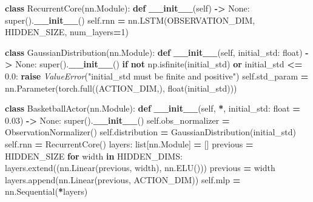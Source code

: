 \documentclass[
  chinese,
  11pt,
  letterpaper,
]{article}
\newenvironment{Shaded}{\begin{snugshade}}{\end{snugshade}}
\newcommand{\BuiltInTok}[1]{#1}
\newcommand{\ControlFlowTok}[1]{\textcolor[rgb]{0.13,0.29,0.53}{\textbf{#1}}}
\newcommand{\DecValTok}[1]{\textcolor[rgb]{0.00,0.00,0.81}{#1}}
\newcommand{\FloatTok}[1]{\textcolor[rgb]{0.00,0.00,0.81}{#1}}
\newcommand{\FunctionTok}[1]{\textcolor[rgb]{0.13,0.29,0.53}{\textbf{#1}}}
\newcommand{\KeywordTok}[1]{\textcolor[rgb]{0.13,0.29,0.53}{\textbf{#1}}}
\newcommand{\NormalTok}[1]{#1}
\newcommand{\OperatorTok}[1]{\textcolor[rgb]{0.81,0.36,0.00}{\textbf{#1}}}
\newcommand{\PreprocessorTok}[1]{\textcolor[rgb]{0.56,0.35,0.01}{\textit{#1}}}
\newcommand{\StringTok}[1]{\textcolor[rgb]{0.31,0.60,0.02}{#1}}
\newcommand{\VariableTok}[1]{\textcolor[rgb]{0.00,0.00,0.00}{#1}}
\renewenvironment{Shaded}{\par\smallskip}{\par\smallskip}
\begin{document}
\begin{Shaded}
\begin{Highlighting}[]
\KeywordTok{class}\NormalTok{ RecurrentCore(nn.Module):}
    \KeywordTok{def} \FunctionTok{\_\_init\_\_}\NormalTok{(}\VariableTok{self}\NormalTok{) }\OperatorTok{{-}\textgreater{}} \VariableTok{None}\NormalTok{:}
        \BuiltInTok{super}\NormalTok{().}\FunctionTok{\_\_init\_\_}\NormalTok{()}
        \VariableTok{self}\NormalTok{.rnn }\OperatorTok{=}\NormalTok{ nn.LSTM(OBSERVATION\_DIM, HIDDEN\_SIZE, num\_layers}\OperatorTok{=}\DecValTok{1}\NormalTok{)}


\KeywordTok{class}\NormalTok{ GaussianDistribution(nn.Module):}
    \KeywordTok{def} \FunctionTok{\_\_init\_\_}\NormalTok{(}\VariableTok{self}\NormalTok{, initial\_std: }\BuiltInTok{float}\NormalTok{) }\OperatorTok{{-}\textgreater{}} \VariableTok{None}\NormalTok{:}
        \BuiltInTok{super}\NormalTok{().}\FunctionTok{\_\_init\_\_}\NormalTok{()}
        \ControlFlowTok{if} \KeywordTok{not}\NormalTok{ np.isfinite(initial\_std) }\KeywordTok{or}\NormalTok{ initial\_std }\OperatorTok{\textless{}=} \FloatTok{0.0}\NormalTok{:}
            \ControlFlowTok{raise} \PreprocessorTok{ValueError}\NormalTok{(}\StringTok{"initial\_std must be finite and positive"}\NormalTok{)}
        \VariableTok{self}\NormalTok{.std\_param }\OperatorTok{=}\NormalTok{ nn.Parameter(torch.full((ACTION\_DIM,), }\BuiltInTok{float}\NormalTok{(initial\_std)))}


\KeywordTok{class}\NormalTok{ BasketballActor(nn.Module):}
    \KeywordTok{def} \FunctionTok{\_\_init\_\_}\NormalTok{(}\VariableTok{self}\NormalTok{, }\OperatorTok{*}\NormalTok{, initial\_std: }\BuiltInTok{float} \OperatorTok{=} \FloatTok{0.03}\NormalTok{) }\OperatorTok{{-}\textgreater{}} \VariableTok{None}\NormalTok{:}
        \BuiltInTok{super}\NormalTok{().}\FunctionTok{\_\_init\_\_}\NormalTok{()}
        \VariableTok{self}\NormalTok{.obs\_normalizer }\OperatorTok{=}\NormalTok{ ObservationNormalizer()}
        \VariableTok{self}\NormalTok{.distribution }\OperatorTok{=}\NormalTok{ GaussianDistribution(initial\_std)}
        \VariableTok{self}\NormalTok{.rnn }\OperatorTok{=}\NormalTok{ RecurrentCore()}
\NormalTok{        layers: }\BuiltInTok{list}\NormalTok{[nn.Module] }\OperatorTok{=}\NormalTok{ []}
\NormalTok{        previous }\OperatorTok{=}\NormalTok{ HIDDEN\_SIZE}
        \ControlFlowTok{for}\NormalTok{ width }\KeywordTok{in}\NormalTok{ HIDDEN\_DIMS:}
\NormalTok{            layers.extend((nn.Linear(previous, width), nn.ELU()))}
\NormalTok{            previous }\OperatorTok{=}\NormalTok{ width}
\NormalTok{        layers.append(nn.Linear(previous, ACTION\_DIM))}
        \VariableTok{self}\NormalTok{.mlp }\OperatorTok{=}\NormalTok{ nn.Sequential(}\OperatorTok{*}\NormalTok{layers)}


\end{Highlighting}
\end{Shaded}
\end{document}
